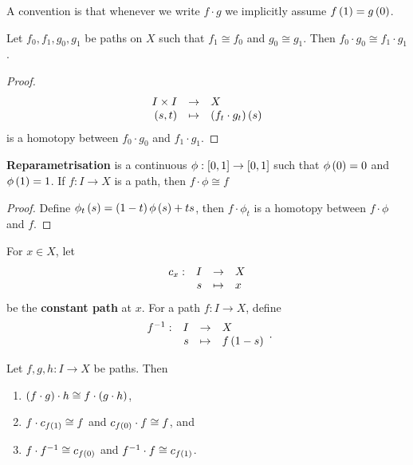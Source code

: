 A convention is that whenever we write $ f \cdot g $ we implicitly assume $ f\rb{1} = g\rb{0} $.

\begin{lemma}
\label{lem:1.2}
Let $ f_0, f_1, g_0, g_1 $ be paths on $ X $ such that $ f_1 \cong f_0 $ and $ g_0 \cong g_1 $. Then $ f_0 \cdot g_0 \cong f_1 \cdot g_1 $.
\end{lemma}

\begin{proof}
$$ \function{I \times I}{X}{\rb{s, t}}{\rb{f_t \cdot g_t}\rb{s}} $$
is a homotopy between $ f_0 \cdot g_0 $ and $ f_1 \cdot g_1 $.
\end{proof}

\begin{remark1}
\textbf{Reparametrisation} is a continuous $ \phi : \sb{0, 1} \to \sb{0, 1} $ such that $ \phi\rb{0} = 0 $ and $ \phi\rb{1} = 1 $. If $ f : I \to X $ is a path, then $ f \cdot \phi \cong f $
\end{remark1}

\begin{proof}
Define $ \phi_t\rb{s} = \rb{1 - t}\phi\rb{s} + ts $, then $ f \cdot \phi_t $ is a homotopy between $ f \cdot \phi $ and $ f $.
\end{proof}

For $ x \in X $, let
$$ \function[c_x]{I}{X}{s}{x} $$
be the \textbf{constant path} at $ x $. For a path $ f : I \to X $, define
$$ \function[f^{-1}]{I}{X}{s}{f\rb{1 - s}}. $$

\begin{lemma}
\label{lem:1.3}
Let $ f, g, h : I \to X $ be paths. Then
\begin{enumerate}
\item $ \rb{f \cdot g} \cdot h \cong f \cdot \rb{g \cdot h} $,
\item $ f \cdot c_{f\rb{1}} \cong f $ and $ c_{f\rb{0}} \cdot f \cong f $, and
\item $ f \cdot f^{-1} \cong c_{f\rb{0}} $ and $ f^{-1} \cdot f \cong c_{f\rb{1}} $.
\end{enumerate}
\end{lemma}

